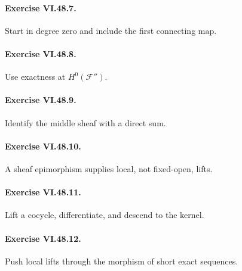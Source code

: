 \paragraph{Exercise VI.48.7.}
\begin{hint}
Start in degree zero and include the first connecting map.
\end{hint}

\paragraph{Exercise VI.48.8.}
\begin{hint}
Use exactness at \(H^0(\mathcal F'')\).
\end{hint}

\paragraph{Exercise VI.48.9.}
\begin{hint}
Identify the middle sheaf with a direct sum.
\end{hint}

\paragraph{Exercise VI.48.10.}
\begin{hint}
A sheaf epimorphism supplies local, not fixed-open, lifts.
\end{hint}

\paragraph{Exercise VI.48.11.}
\begin{hint}
Lift a cocycle, differentiate, and descend to the kernel.
\end{hint}

\paragraph{Exercise VI.48.12.}
\begin{hint}
Push local lifts through the morphism of short exact sequences.
\end{hint}

